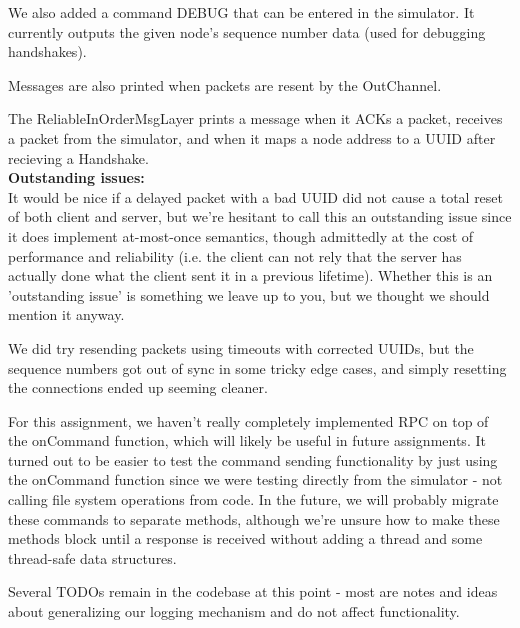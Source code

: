 \documentclass[11pt]{article}
\begin{document}
We also added a command DEBUG that can be entered in the simulator. It currently outputs the given node's sequence number data (used for debugging handshakes).

Messages are also printed when packets are resent by the OutChannel.

The ReliableInOrderMsgLayer prints a message when it ACKs a packet, receives a packet from the simulator, and when it maps a node address to a UUID after recieving a Handshake. \\

\textbf{Outstanding issues:} \\

It would be nice if a delayed packet with a bad UUID did not cause a total reset of both client and server, but we're hesitant to call this an outstanding issue since it does implement at-most-once semantics, though admittedly at the cost of performance and reliability (i.e. the client can not rely that the server has actually done what the client sent it in a previous lifetime). Whether this is an 'outstanding issue' is something we leave up to you, but we thought we should mention it anyway.

We did try resending packets using timeouts with corrected UUIDs, but the sequence numbers got out of sync in some tricky edge cases, and simply resetting the connections ended up seeming cleaner.

For this assignment, we haven't really completely implemented RPC on top of the onCommand function, which will likely be useful in future assignments. It turned out to be easier to test the command sending functionality by just using the onCommand function since we were testing directly from the simulator - not calling file system operations from code. In the future, we will probably migrate these commands to separate methods, although we're unsure how to make these methods block until a response is received without adding a thread and some thread-safe data structures.

Several TODOs remain in the codebase at this point - most are notes and ideas about generalizing our logging mechanism and do not affect functionality. \\
\end{document}
